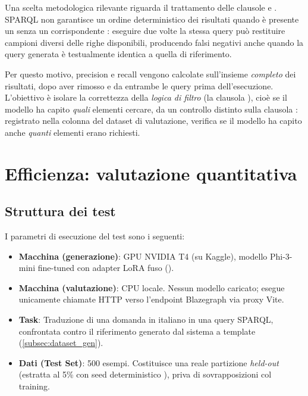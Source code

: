 Una scelta metodologica rilevante riguarda il trattamento delle clausole  e . SPARQL non garantisce un ordine deterministico dei risultati quando è presente un  senza un corrispondente : eseguire due volte la stessa query può restituire campioni diversi delle righe disponibili, producendo falsi negativi anche quando la query generata è testualmente identica a quella di riferimento.

Per questo motivo, precision e recall vengono calcolate sull'insieme \emph{completo} dei risultati, dopo aver rimosso  e  da entrambe le query prima dell'esecuzione. L'obiettivo è isolare la correttezza della \emph{logica di filtro} (la clausola ), cioè se il modello ha capito \emph{quali} elementi cercare, da un controllo distinto sulla clausola : registrato nella colonna  del dataset di valutazione, verifica se il modello ha capito anche \emph{quanti} elementi erano richiesti.

\section{Efficienza: valutazione quantitativa}\label{sec:efficienza}

\subsection{Struttura dei test}\label{subsec:struttura_test}

I parametri di esecuzione del test sono i seguenti:

\begin{itemize}
    \item \textbf{Macchina (generazione)}: GPU NVIDIA T4 (su Kaggle), modello Phi-3-mini fine-tuned con adapter LoRA fuso ().
    \item \textbf{Macchina (valutazione)}: CPU locale. Nessun modello caricato; esegue unicamente chiamate HTTP verso l'endpoint Blazegraph via proxy Vite.
    \item \textbf{Task}: Traduzione di una domanda in italiano in una query SPARQL, confrontata contro il riferimento generato dal sistema a template (\cref{subsec:dataset_gen}).
    \item \textbf{Dati (Test Set)}: 500 esempi. Costituisce una reale partizione \textit{held-out} (estratta al 5\% con seed deterministico ), priva di sovrapposizioni col training.
\end{itemize}

